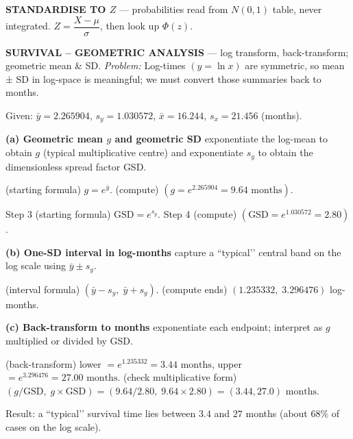 \documentclass[landscape,0.4pt]{article}
\begin{document}
\begin{multicols*}{6}
\textbf{\tiny{STANDARDISE TO $Z$}} — probabilities read from $N(0,1)$ table, never integrated.  
$Z=\dfrac{X-\mu}{\sigma}$, then look up $\Phi(z)$.


\textbf{\tiny{SURVIVAL – GEOMETRIC ANALYSIS}} — log transform, back-transform; geometric mean \& SD.  
\textit{Problem:} Log-times $(y=\ln x)$ are symmetric, so mean ± SD in log-space is meaningful; we must convert those summaries back to months.

Given: $\bar{y}=2.265904$, $s_y=1.030572$,  $\bar{x}=16.244$, $s_x=21.456$ (months).

\textbf{\tiny{(a) Geometric mean $g$ and geometric SD}}  
 exponentiate the log-mean to obtain $g$ (typical multiplicative centre) and exponentiate $s_y$ to obtain the dimensionless spread factor GSD.

(starting formula)  $g=e^{\bar{y}}$.  
 (compute) $(g=e^{2.265904}=9.64\text{ months})$.  

Step 3 (starting formula)  $\text{GSD}=e^{s_y}$.  
Step 4 (compute) $(\text{GSD}=e^{1.030572}=2.80)$.  

\textbf{\tiny{(b) One-SD interval in log-months}}  
 capture a “typical’’ central band on the log scale using $\bar{y}\pm s_y$.

(interval formula) $(\bar{y}-s_y,\;\bar{y}+s_y)$.  
 (compute ends) $(1.235332,\;3.296476)$ log-months.  

\textbf{\tiny{(c) Back-transform to months}}  
 exponentiate each endpoint; interpret as $g$ multiplied or divided by GSD.

(back-transform) lower $=e^{1.235332}=3.44\text{ months}$, upper $=e^{3.296476}=27.00\text{ months}$.  
 (check multiplicative form) $(g/\text{GSD},\;g\!\times\!\text{GSD})=(9.64/2.80,\;9.64\times2.80)=(3.44,27.0)\text{ months}$.  

Result: a “typical’’ survival time lies between $3.4$ and $27$ months (about 68\% of cases on the log scale).  




\end{multicols*}
\end{document}
